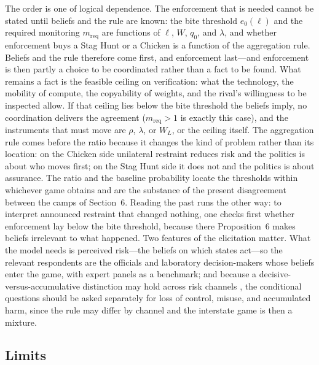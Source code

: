 \documentclass[11pt]{article}
\theoremstyle{plain}
\theoremstyle{definition}
\theoremstyle{remark}
\begin{document}
The order is one of logical dependence. The enforcement that is needed cannot be stated until beliefs and the rule are known: the bite threshold $e_0(\ell)$ and the required monitoring $m_{\mathrm{req}}$ are functions of $\ell$, $W$, $q_0$, and $\lambda$, and whether enforcement buys a Stag Hunt or a Chicken is a function of the aggregation rule. Beliefs and the rule therefore come first, and enforcement last---and enforcement is then partly a choice to be coordinated rather than a fact to be found. What remains a fact is the feasible ceiling on verification: what the technology, the mobility of compute, the copyability of weights, and the rival's willingness to be inspected allow. If that ceiling lies below the bite threshold the beliefs imply, no coordination delivers the agreement ($m_{\mathrm{req}}>1$ is exactly this case), and the instruments that must move are $\rho$, $\lambda$, or $W_L$, or the ceiling itself. The aggregation rule comes before the ratio because it changes the kind of problem rather than its location: on the Chicken side unilateral restraint reduces risk and the politics is about who moves first; on the Stag Hunt side it does not and the politics is about assurance. The ratio and the baseline probability locate the thresholds within whichever game obtains and are the substance of the present disagreement between the camps of Section~6. Reading the past runs the other way: to interpret announced restraint that changed nothing, one checks first whether enforcement lay below the bite threshold, because there Proposition~6 makes beliefs irrelevant to what happened. Two features of the elicitation matter. What the model needs is perceived risk---the beliefs on which states act---so the relevant respondents are the officials and laboratory decision-makers whose beliefs enter the game, with expert panels as a benchmark; and because a decisive-versus-accumulative distinction may hold across risk channels \citep{kasirzadeh2025}, the conditional questions should be asked separately for loss of control, misuse, and accumulated harm, since the rule may differ by channel and the interstate game is then a mixture.

\subsection{Limits}
\end{document}
